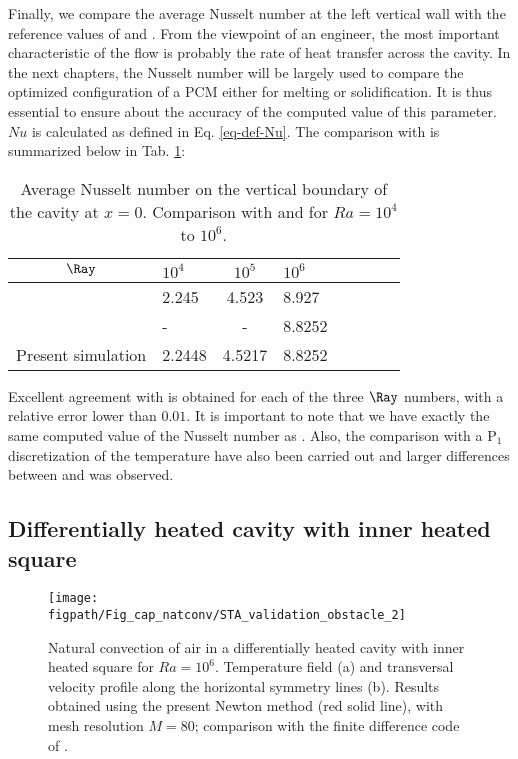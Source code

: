Finally, we compare the average Nusselt number at the left vertical wall with the reference values of \cite{de1983natural} and \cite{LeQuere91}.
From the viewpoint of an engineer, the most important characteristic of the flow is probably the rate of heat  transfer across the cavity.
In the next chapters, the Nusselt number will be largely used to compare the optimized configuration of a PCM either for melting or solidification.
It is thus essential to ensure about the accuracy of the computed value of this parameter.
$N\!u$ is calculated as defined in Eq. \ref{eq-def-Nu}.
The comparison with \cite{de1983natural} is summarized below in Tab. \ref{tab-Nu-natconv}:
\begin{table}[ht!]
   \begin{center}
      \begin{tabular}{*{4}{cl}}
         
       $\Ray$ & $10^4$ &$ 10^5$ & $10^6 $ \\
         \hline
        \cite{de1983natural} & 2.245 & 4.523  & 8.927 \\
        \cite{LeQuere91} & - & - &  8.8252 \\
        Present simulation & 2.2448 & 4.5217  & 8.8252 \\
      \end{tabular}
   \end{center}
   \caption{Average Nusselt number on the vertical boundary of the cavity at $x=0$. Comparison with \cite{de1983natural} and \cite{LeQuere91} for $Ra = 10^4$ to $10^6$.}
   \label{tab-Nu-natconv}
\end{table}

Excellent agreement with \cite{de1983natural} is obtained for each of the three $\Ray$ numbers, with a relative error lower than $0.01$.
It is important to note that we have exactly the same computed value of the Nusselt number as \cite{LeQuere91}.
Also, the comparison with a P$_1$ discretization of the temperature have also been carried out and larger differences between \cite{de1983natural} and \cite{LeQuere91} was observed.

\subsection{Differentially heated cavity with inner heated square} \label{sub-2D-OBSTACLE}

\begin{figure}
	\begin{center}
		\texttt{[image: \\figpath/Fig\_cap\_natconv/STA\_validation\_obstacle\_2]} 
	\end{center}
	\caption{Natural convection of air in a differentially heated cavity with inner heated square for $Ra = 10^6$. Temperature field (a) and transversal velocity profile along the  horizontal symmetry lines (b). Results obtained using the present Newton method (red solid line), with mesh resolution $M=80$; comparison with the finite difference code of \cite{Raluca2013}.}
	\label{fig-obst-2D}
\end{figure}

